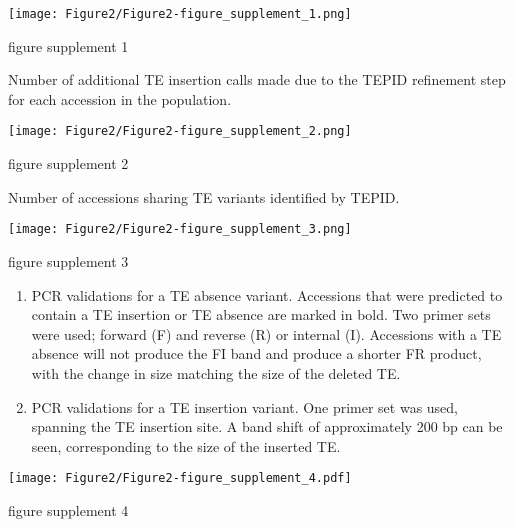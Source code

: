 \documentclass[12pt]{article}
\begin{document}
\pagebreak


\setcounter{suppfigure}{1}
\begin{suppfigure}
  \centering
  \texttt{[image: Figure2/Figure2-figure\_supplement\_1.png]}
  \caption{figure supplement 1}
  \label{fig2s1}
\end{suppfigure}

Number of additional TE insertion calls made due to the TEPID refinement
step for each accession in the population.

\pagebreak
\setcounter{suppfigure}{1}

\begin{suppfigure}
  \centering
  \texttt{[image: Figure2/Figure2-figure\_supplement\_2.png]}
  \caption{figure supplement 2}
  \label{fig2s2}
\end{suppfigure}

Number of accessions sharing TE variants identified by TEPID.

\pagebreak
\setcounter{suppfigure}{1}

\begin{suppfigure}
  \centering
  \texttt{[image: Figure2/Figure2-figure\_supplement\_3.png]}
  \caption{figure supplement 3}
  \label{fig2s3}
\end{suppfigure}

\begin{enumerate}
\def\labelenumi{(\Alph{enumi})}
\item
  PCR validations for a TE absence variant. Accessions that were
  predicted to contain a TE insertion or TE absence are marked in bold.
  Two primer sets were used; forward (F) and reverse (R) or internal
  (I). Accessions with a TE absence will not produce the FI band and
  produce a shorter FR product, with the change in size matching the
  size of the deleted TE.
\item
  PCR validations for a TE insertion variant. One primer set was used,
  spanning the TE insertion site. A band shift of approximately 200 bp
  can be seen, corresponding to the size of the inserted TE.
\end{enumerate}

\pagebreak

\setcounter{suppfigure}{1}

\begin{suppfigure}
  \centering
  \texttt{[image: Figure2/Figure2-figure\_supplement\_4.pdf]}
  \caption{figure supplement 4}
  \label{fig2s4}
\end{suppfigure}
\end{document}
